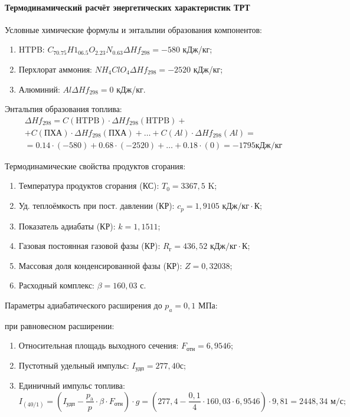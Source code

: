 \paragraph{Термодинамический расчёт энергетических характеристик ТРТ}

Условные химические формулы и энтальпии образования компонентов:
\begin{enumerate}[1.]
	\item HTPB: 			 $C_{70.75}H1_{06.5}O_{2.23}N_{0.63}	\Delta Hf_{298}=-580 $ кДж/кг;
	\item Перхлорат аммония: $  NH_4ClO_4	 		\Delta Hf_{298}=-2520 $ кДж/кг;
	\item Алюминий: 		 $ Al				\Delta Hf_{298}= 0 $ кДж/кг.
\end{enumerate}

Энтальпия образования топлива:
\begin{multline*}
	\Delta Hf_{298}=  C(\text{HTPB}) \cdot \Delta Hf_{298}(\text{HTPB}) + \\ + C(\text{ПХА}) \cdot \Delta Hf_{298}(\text{ПХА}) + \dots + C(Al) \cdot \Delta Hf_{298}(Al) = \\ = 0.14 \cdot (-580) + 0.68 \cdot (-2520) + \dots 	+ 0.18 \cdot (0) = -1795  \text{кДж/кг}
\end{multline*}


Термодинамические свойства продуктов сгорания:
\begin{enumerate}[1.]
	\item Температура продуктов сгорания (КС): 	$T_0 = 3367,5$ K;
	\item Уд. теплоёмкость при пост. давлении (КР): 	$c_p = 1,9105 \text{ кДж/кг} \cdot \text{К} $;
	\item Показатель адиабаты (КР): 				$k = 1,1511$;
	\item Газовая постоянная газовой фазы (КР):		$R_\text{г} = 436,52 \text{ кДж/кг} \cdot \text{К}$;
	\item Массовая доля конденсированной фазы (КР):		$Z = 0,32038$;
	\item Расходный комплекс:					$\beta = 160,03 $ с.
\end{enumerate}

Параметры адиабатического расширения до $p_a = 0,1$ МПа:

при равновесном расширении:
\begin{enumerate}[1.]
	\item Относительная площадь выходного сечения:	$F_\text{отн} = 6,9546$;
	\item Пустотный удельный импульс:				$I_\text{удп} = 277,40с$;
	\item Единичный импульс топлива:
$$I_{(40/1)}=(I_\text{удп}-\frac{p_\text{a}}{p} \cdot \beta \cdot F_\text{отн} ) \cdot g=(277,4-\frac{0,1}{4} \cdot 160,03 \cdot 6,9546) \cdot 9,81=2448,34 \text{ м/с;}$$
\end{enumerate}

